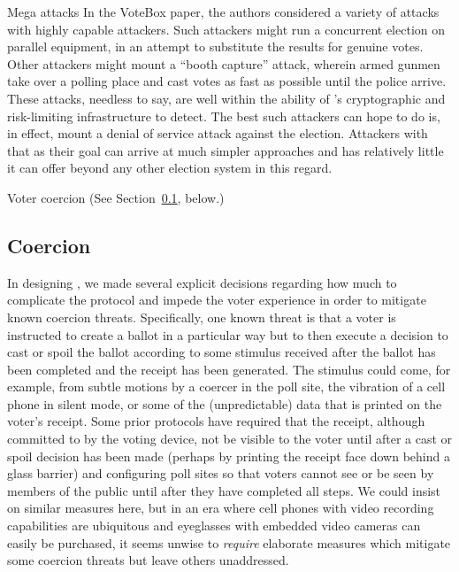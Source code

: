 \begin{compactdesc}
\item[Mega attacks]
  In the VoteBox paper, the authors considered a variety of attacks with highly capable attackers. Such attackers might run a concurrent election on parallel equipment, in an attempt to substitute the results for genuine votes. Other attackers might mount a ``booth capture'' attack, wherein armed gunmen take over a polling place and cast votes as fast as possible until the police arrive. These attacks, needless to say, are well within the ability of \projname's cryptographic and risk-limiting infrastructure to detect. The best such attackers can hope to do is, in effect, mount a denial of service attack against the election. Attackers with that as their goal can arrive at much simpler approaches and \projname has relatively little it can offer beyond any other election system in this regard.

\item[Voter coercion]
(See Section~\ref{sec:coercion}, below.)

\end{compactdesc}
\subsection{Coercion}
\label{sec:coercion}
In designing \projname, we made several explicit decisions regarding how much to complicate the protocol and impede the voter experience in order to mitigate known coercion threats.  Specifically, one known threat is that a voter is instructed to create a ballot in a particular way but to then execute a decision to cast or spoil the ballot according to some stimulus received after the ballot has been completed and the receipt has been generated.  The stimulus could come, for example, from subtle motions by a coercer in the poll site, the vibration of a cell phone in silent mode, or some of the (unpredictable) data that is printed on the voter’s receipt.  Some prior protocols have required that the receipt, although committed to by the voting device, not be visible to the voter until after a cast or spoil decision has been made (perhaps by printing the receipt face down behind a glass barrier) and configuring poll sites so that voters cannot see or be seen by members of the public until after they have completed all steps.  We could insist on similar measures here, but in an era where cell phones with video recording capabilities are ubiquitous and eyeglasses with embedded video cameras can easily be purchased, it seems unwise to {\em require} elaborate measures which mitigate some coercion threats but leave others unaddressed.

